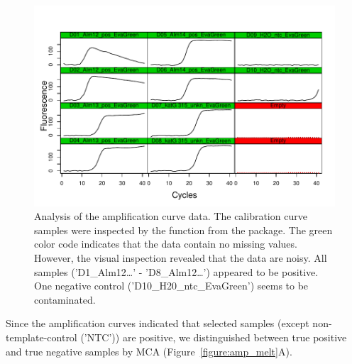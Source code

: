 \begin{figure}[htbp]
  \centering
  \includegraphics[clip=true, trim=0.2cm 0.3cm 0.4cm 1.2cm, width=12cm]{figures/plotCurves.pdf}
  \caption{Analysis of the amplification curve data. The calibration curve 
samples were inspected by the  function from the 
 package. The green color code indicates that the data contain 
no missing values. However, the visual inspection revealed that the data are 
noisy. All samples ('D1\_Alm12\ldots' - 'D8\_Alm12\ldots') appeared to be 
positive. One negative control ('D10\_H20\_ntc\_EvaGreen') 
seems to be contaminated.}
  \label{figure:plotCurves}
\end{figure}

Since the amplification curves indicated that selected samples (except 
non-template-control ('NTC')) are positive, we distinguished between true 
positive and true negative samples by MCA (Figure~\ref{figure:amp_melt}A).


